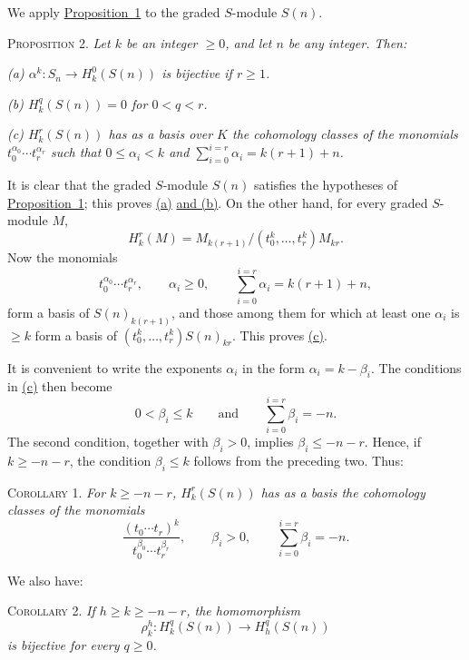 We apply \hyperref[fac:III:3:no:62:prop:1]{Proposition~1} to the graded
$S$-module $S(n)$.

\label{fac:III:3:no:62:prop:2}
\textsc{Proposition 2.} \textit{Let $k$ be an integer $\geq0$, and let
$n$ be any integer. Then:}

\label{fac:III:3:no:62:prop:2:item:a}
\textit{(a) $\alpha^k:S_n\to H_k^0(S(n))$ is bijective if $r\geq1$.}

\label{fac:III:3:no:62:prop:2:item:b}
\textit{(b) $H_k^q(S(n))=0$ for $0<q<r$.}

\label{fac:III:3:no:62:prop:2:item:c}
\textit{(c) $H_k^r(S(n))$ has as a basis over $K$ the cohomology
classes of the monomials $t_0^{\alpha_0}\cdots t_r^{\alpha_r}$ such
that $0\leq\alpha_i<k$ and
$\sum_{i=0}^{i=r}\alpha_i=k(r+1)+n$.}

It is clear that the graded $S$-module $S(n)$ satisfies the hypotheses
of \hyperref[fac:III:3:no:62:prop:1]{Proposition~1}; this proves
\hyperref[fac:III:3:no:62:prop:2:item:a]{(a)}
\hyperref[fac:III:3:no:62:prop:2:item:b]{and (b)}. On the other hand, for
every graded $S$-module $M$,
\label{fac:III:3:no:62:formula:top-cohomology-quotient}
\[
H_k^r(M)=
M_{k(r+1)}/(t_0^k,\ldots,t_r^k)M_{kr}.
\]
Now the monomials
\[
t_0^{\alpha_0}\cdots t_r^{\alpha_r},\qquad
\alpha_i\geq0,\qquad
\sum_{i=0}^{i=r}\alpha_i=k(r+1)+n,
\]
form a basis of $S(n)_{k(r+1)}$, and those among them for which at
least one $\alpha_i$ is $\geq k$ form a basis of
$(t_0^k,\ldots,t_r^k)S(n)_{kr}$. This proves
\hyperref[fac:III:3:no:62:prop:2:item:c]{(c)}.

It is convenient to write the exponents $\alpha_i$ in the form
$\alpha_i=k-\beta_i$. The conditions in
\hyperref[fac:III:3:no:62:prop:2:item:c]{(c)} then become
\label{fac:III:3:no:62:formula:beta-conditions}
\[
0<\beta_i\leq k
\qquad\text{and}\qquad
\sum_{i=0}^{i=r}\beta_i=-n.
\]
The second condition, together with $\beta_i>0$, implies
$\beta_i\leq -n-r$. Hence, if $k\geq -n-r$, the condition
$\beta_i\leq k$ follows from the preceding two. Thus:

\label{fac:III:3:no:62:cor:1}
\textsc{Corollary 1.} \textit{For $k\geq-n-r$, $H_k^r(S(n))$ has as
a basis the cohomology classes of the monomials}
\[
\frac{(t_0\cdots t_r)^k}
{t_0^{\beta_0}\cdots t_r^{\beta_r}},
\qquad \beta_i>0,\qquad
\sum_{i=0}^{i=r}\beta_i=-n.
\]

We also have:

\label{fac:III:3:no:62:cor:2}
\textsc{Corollary 2.} \textit{If $h\geq k\geq-n-r$, the homomorphism}
\[
\rho_k^h:H_k^q(S(n))\longrightarrow H_h^q(S(n))
\]
\textit{is bijective for every $q\geq0$.}

